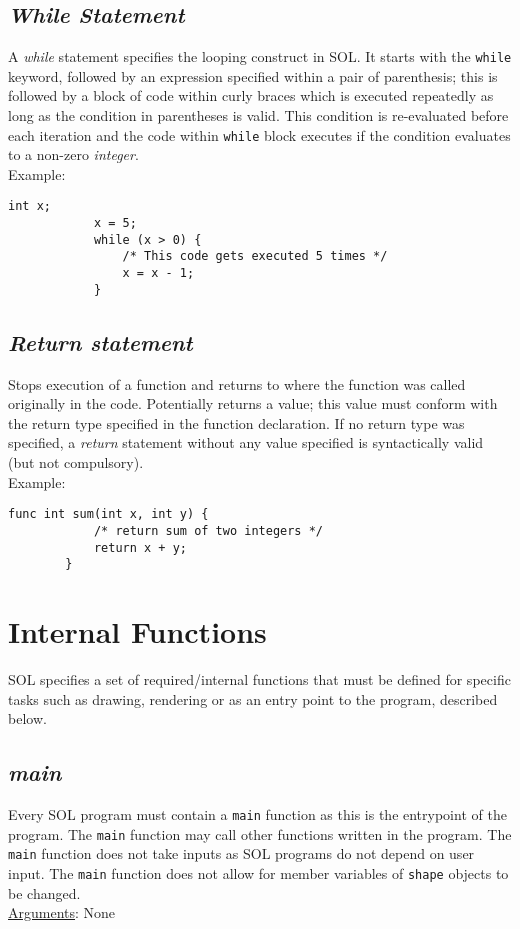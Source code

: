     \subsection{\textit{While Statement}}
    A \textit{while} statement specifies the looping construct in SOL. It starts with the \texttt{while} keyword, followed by an expression specified within a pair of parenthesis; this is followed by a block of code within curly braces which is executed repeatedly as long as the condition in parentheses is valid. This condition is re-evaluated before each iteration and the code within \texttt{while} block executes if the condition evaluates to a non-zero \textit{integer}. \\
    Example:\\
    \begin{lstlisting}[style=sol]
            int x;
            x = 5;
            while (x > 0) {
                /* This code gets executed 5 times */
                x = x - 1;
            }
        \end{lstlisting}

    \subsection{\textit{Return statement}}
    Stops execution of a function and returns to where the function was called originally in the code. Potentially returns a value; this value must conform with the return type specified in the function declaration. If no return type was specified, a \textit{return} statement without any value specified is syntactically valid (but not compulsory).\\
    Example:\\
    \begin{lstlisting}[style=sol]
        func int sum(int x, int y) {
            /* return sum of two integers */
            return x + y;
        }
    \end{lstlisting}
    
\section{Internal Functions} \label{internal}
SOL specifies a set of required/internal functions that must be defined for specific tasks such as drawing, rendering or as an entry point to the program, described below.

    \subsection{\textit{main}}
    Every SOL program must contain a \texttt{main} function as this is the entrypoint of the program. The \texttt{main} function may call other functions written in the program. The \texttt{main} function does not take inputs as SOL programs do not depend on user input. The \texttt{main} function does not allow for member variables of \texttt{shape} objects to be changed.\\
    \underline{Arguments}: None

